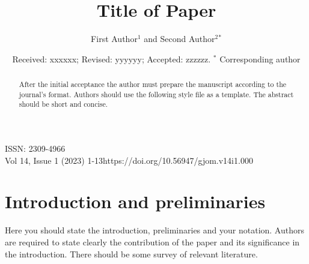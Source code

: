 \documentclass[12pt, reqno]{amsart}
\theoremstyle{definition}
\theoremstyle{remark}
\numberwithin{equation}{section}
\begin{document}
\setcounter{page}{1}


\hfill     {\small ISSN: 2309-4966}\\
{\small Vol 14, Issue 1 (2023) 1-13}\hfill  {\small https://doi.org/10.56947/gjom.v14i1.000}



\centerline{}

\centerline{}

\title[Short Title]{Title of Paper}

\author[F. Author, S. Author]{First Author$^1$ \MakeLowercase {and} Second Author$^2$$^{*}$}


\address{$^{1}$ Department of Mathematics, University of Gulf, Dubai, UAE.}
\email{\textcolor[rgb]{0.00,0.00,0.84}{first@gjom.org}}

\address{$^{2}$ Department of Statistics, University of Abu Dhabi, PO Box 881155, Abu Dhabi, UAE}
\email{\textcolor[rgb]{0.00,0.00,0.84}{second@gjom.org}}




\date{Received: xxxxxx; Revised: yyyyyy; Accepted: zzzzzz.
\newline \indent $^{*}$ Corresponding author}

\begin{abstract}
After the initial acceptance the author must prepare the manuscript according to the journal's format. Authors should use the following style file as a template. The abstract should be short and concise.
\end{abstract} \maketitle

\section{Introduction and preliminaries}

\noindent Here you should state the introduction, preliminaries and
your notation. Authors are required to state clearly the
contribution of the paper and its significance in the introduction.
There should be some survey of relevant literature.
\end{document}
